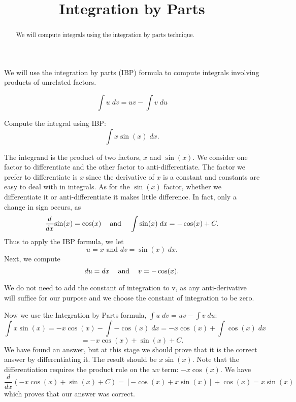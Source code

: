 \documentclass{ximera}
\title{Integration by Parts}
\begin{document}
\begin{abstract}
We will compute integrals using the integration by parts technique.
\end{abstract}

\maketitle


We will use the integration by parts (IBP) formula to compute integrals involving products of unrelated factors.

\begin{theorem}
\[
\int u \; dv = uv - \int v \; du
\]
\end{theorem}






\begin{example} %
Compute the integral using IBP:
  \[
  \int x\sin(x) \;dx.
  \]
  
  The integrand is the product of two factors, $x$ and $\sin(x)$.  We consider one factor to differentiate and the other factor to anti-differentiate.
  The factor we prefer to differentiate is $x$ since the derivative of $x$ is a constant and constants are easy to deal with in integrals.
  As for the $\sin(x)$ factor, whether we differentiate it or anti-differentiate it makes little difference.  In fact, only a change in sign occurs,
  as 
  \[\frac{d}{dx}{\sin(x)} = \cos(x)    \text{ \;\;   and \;\;   }   \int \sin(x) \;dx = -\cos(x) + C.\]
  Thus to apply the IBP formula, we let
  \[u=x \text{  and  }  dv = \sin(x) \;dx.\]
  Next, we compute
  \[du = dx  \text{  \;\;  and \;\;   }  v = -\cos(x).\]
  \begin{remark} 
  We do not need to add the constant of integration to v, as any anti-derivative will suffice 
  for our purpose and we choose the constant of integration to be zero.
  \end{remark}
  Now we use the Integration by Parts formula, $\int u\;dv = uv-\int v\; du$:
  \[
  \int x\sin(x) = -x\cos(x) - \int -\cos(x) \;dx = -x\cos(x) + \int \cos(x) \;dx
  \]
  \[
  = -x\cos(x) + \sin(x) + C.
  \]
  We have found an answer, but at this stage we should prove that it is the correct answer by differentiating it.  The result should be $x\sin(x)$.
  Note that the differentiation requires the product rule on the $uv$ term: $-x\cos(x)$.
  We have
  \[
  \frac{d}{dx}{\left(-x\cos(x) + \sin(x) + C\right)} = [-\cos(x) + x\sin(x)] + \cos(x) = x\sin(x)
  \]
  which proves that our answer was correct.
  
    
\end{example}
\end{document}
